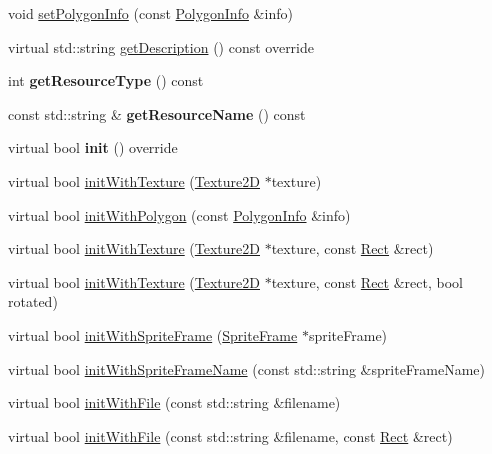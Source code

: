 \begin{DoxyCompactItemize}
\item 
void \hyperlink{classSprite_a2ab8f707e76545845606c8de023d4f91}{set\+Polygon\+Info} (const \hyperlink{classPolygonInfo}{Polygon\+Info} \&info)
\item 
virtual std\+::string \hyperlink{classSprite_acc5ff8de93a81ddd7f3d4af5c7ba0d39}{get\+Description} () const override
\item 
\mbox{\label{classSprite_a9e607bfde5d4f8e6a66bb5c8b0351522}} 
int {\bfseries get\+Resource\+Type} () const
\item 
\mbox{\label{classSprite_aa08e90540dd460e580ee0ccbd1119fe1}} 
const std\+::string \& {\bfseries get\+Resource\+Name} () const
\item 
\mbox{\label{classSprite_a615fba2bdb622d387496954dd5a8cc54}} 
virtual bool {\bfseries init} () override
\item 
virtual bool \hyperlink{classSprite_a86490028d10f0a15f6090ae2b3a8ca26}{init\+With\+Texture} (\hyperlink{classTexture2D}{Texture2D} $\ast$texture)
\item 
virtual bool \hyperlink{classSprite_ad2f432b077c8e919ca9e20c34e8610f8}{init\+With\+Polygon} (const \hyperlink{classPolygonInfo}{Polygon\+Info} \&info)
\item 
virtual bool \hyperlink{classSprite_a6757ea17c8d1d6bbb0fad0b9a1da1940}{init\+With\+Texture} (\hyperlink{classTexture2D}{Texture2D} $\ast$texture, const \hyperlink{classRect}{Rect} \&rect)
\item 
virtual bool \hyperlink{classSprite_a4866d1d8a09f7617ed7fa838f59ba828}{init\+With\+Texture} (\hyperlink{classTexture2D}{Texture2D} $\ast$texture, const \hyperlink{classRect}{Rect} \&rect, bool rotated)
\item 
virtual bool \hyperlink{classSprite_a18c315cb483cfec2ed836c02c958810b}{init\+With\+Sprite\+Frame} (\hyperlink{classSpriteFrame}{Sprite\+Frame} $\ast$sprite\+Frame)
\item 
virtual bool \hyperlink{classSprite_ab30fa40d8c557779a21a2a941c3f18ea}{init\+With\+Sprite\+Frame\+Name} (const std\+::string \&sprite\+Frame\+Name)
\item 
virtual bool \hyperlink{classSprite_aaf44b73e6e009525f1cd222985a5ed4f}{init\+With\+File} (const std\+::string \&filename)
\item 
virtual bool \hyperlink{classSprite_af94c86a971b4ebab60cdd884e8902c06}{init\+With\+File} (const std\+::string \&filename, const \hyperlink{classRect}{Rect} \&rect)

\end{DoxyCompactItemize}
